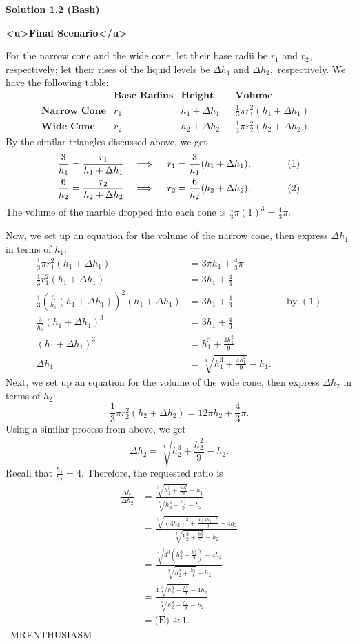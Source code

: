 \begin{enumerate}
\textbf{Solution 1.2 (Bash)}

\textbf{<u>Final Scenario</u>}

 For the narrow cone and the wide cone, let their base radii be $r_1$ and $r_2,$ respectively; let their rises of the liquid levels be $\Delta h_1$ and $\Delta h_2,$ respectively. We have the following table:
 \[\begin{array}{cccccc} & \textbf{Base Radius} & \textbf{Height} & & \textbf{Volume} & \\ [2ex]  \textbf{Narrow Cone} & r_1 & h_1+\Delta h_1 & & \frac13\pi r_1^2(h_1+\Delta h_1) & \\ [2ex]  \textbf{Wide Cone} & r_2 & h_2+\Delta h_2 & & \frac13\pi r_2^2(h_2+\Delta h_2) & \end{array}\]By the similar triangles discussed above, we get
 \begin{align*} \frac{3}{h_1}&=\frac{r_1}{h_1+\Delta h_1} &\implies \quad r_1&=\frac{3}{h_1}(h_1+\Delta h_1), & \hspace{10mm} (1) \\ \frac{6}{h_2}&=\frac{r_2}{h_2+\Delta h_2} &\implies \quad r_2&=\frac{6}{h_2}(h_2+\Delta h_2). & (2) \end{align*}
The volume of the marble dropped into each cone is $\frac43\pi(1)^3=\frac43\pi.$

 Now, we set up an equation for the volume of the narrow cone, then express $\Delta h_1$ in terms of $h_1:$
 \begin{align*} \frac13\pi r_1^2(h_1+\Delta h_1) &= 3\pi h_1+\frac43\pi \\ \frac13 r_1^2(h_1+\Delta h_1) &= 3h_1+\frac43 \\ \frac13\left(\frac{3}{h_1}(h_1+\Delta h_1)\right)^2(h_1+\Delta h_1) &= 3h_1+\frac43 &&\text{by }(1) \\ \frac{3}{h_1^2}(h_1+\Delta h_1)^3 &= 3h_1+\frac43 \\ (h_1+\Delta h_1)^3 &= h_1^3 + \frac{4h_1^2}{9} \\ \Delta h_1 &= \sqrt[3]{h_1^3 + \frac{4h_1^2}{9}}-h_1. \end{align*}
Next, we set up an equation for the volume of the wide cone, then express $\Delta h_2$ in terms of $h_2:$
 \[\frac13\pi r_2^2(h_2+\Delta h_2) = 12\pi h_2+\frac43\pi.\]Using a similar process from above, we get 
 \[\Delta h_2 = \sqrt[3]{h_2^3+\frac{h_2^2}{9}}-h_2.\]Recall that $\frac{h_1}{h_2}=4.$ Therefore, the requested ratio is 
 \begin{align*} \frac{\Delta h_1}{\Delta h_2}&=\frac{\sqrt[3]{h_1^3 + \frac{4h_1^2}{9}}-h_1}{\sqrt[3]{h_2^3+\frac{h_2^2}{9}}-h_2} \\ &=\frac{\sqrt[3]{(4h_2)^3 + \frac{4(4h_2)^2}{9}}-4h_2}{\sqrt[3]{h_2^3+\frac{h_2^2}{9}}-h_2} \\ &=\frac{\sqrt[3]{4^3\left(h_2^3 + \frac{h_2^2}{9}\right)}-4h_2}{\sqrt[3]{h_2^3+\frac{h_2^2}{9}}-h_2} \\ &=\frac{4\sqrt[3]{h_2^3+\frac{h_2^2}{9}}-4h_2}{\sqrt[3]{h_2^3+\frac{h_2^2}{9}}-h_2} \\ &=\boxed{\textbf{(E) }4:1}. \end{align*}
~MRENTHUSIASM


\end{enumerate}
